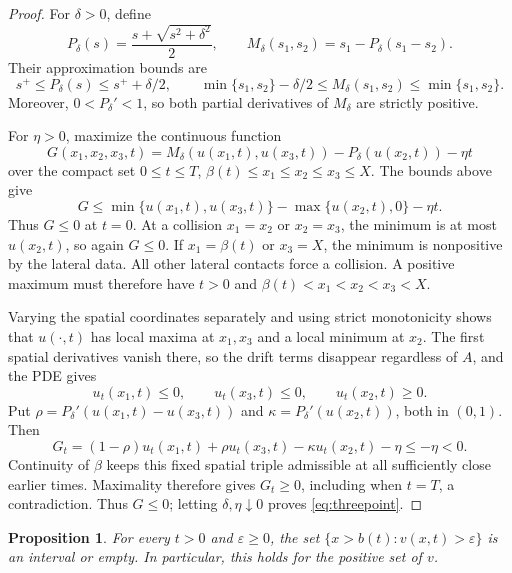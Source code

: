 \documentclass[11pt]{article}
\newtheorem{proposition}[theorem]{Proposition}
\begin{document}
\begin{proof}
For $\delta>0$, define
\[
  P_\delta(s)=\frac{s+\sqrt{s^2+\delta^2}}2,\qquad
  M_\delta(s_1,s_2)=s_1-P_\delta(s_1-s_2).
\]
Their approximation bounds are
\[
  s^+\le P_\delta(s)\le s^++\delta/2,
  \qquad
  \min\{s_1,s_2\}-\delta/2\le M_\delta(s_1,s_2)\le\min\{s_1,s_2\}.
\]
Moreover, $0<P_\delta'<1$, so both partial derivatives of
$M_\delta$ are strictly positive.

For $\eta>0$, maximize the continuous function
\[
  G(x_1,x_2,x_3,t)
    =M_\delta(u(x_1,t),u(x_3,t))-P_\delta(u(x_2,t))-\eta t
\]
over the compact set $0\le t\le T$,
$\beta(t)\le x_1\le x_2\le x_3\le X$.
The bounds above give
\[
  G\le\min\{u(x_1,t),u(x_3,t)\}-\max\{u(x_2,t),0\}-\eta t.
\]
Thus $G\le0$ at $t=0$. At a collision $x_1=x_2$ or $x_2=x_3$,
the minimum is at most $u(x_2,t)$, so again $G\le0$.
If $x_1=\beta(t)$ or $x_3=X$, the minimum is nonpositive by the
lateral data. All other lateral contacts force a collision.
A positive maximum must therefore have
$t>0$ and $\beta(t)<x_1<x_2<x_3<X$.

Varying the spatial coordinates separately and using strict
monotonicity shows that $u(\cdot,t)$ has local maxima at $x_1,x_3$
and a local minimum at $x_2$. The first spatial derivatives vanish
there, so the drift terms disappear regardless of $A$, and the PDE gives
\[
  u_t(x_1,t)\le0,\qquad u_t(x_3,t)\le0,\qquad u_t(x_2,t)\ge0.
\]
Put $\rho=P_\delta'(u(x_1,t)-u(x_3,t))$ and
$\kappa=P_\delta'(u(x_2,t))$, both in $(0,1)$. Then
\[
  G_t=(1-\rho)u_t(x_1,t)+\rho u_t(x_3,t)-\kappa u_t(x_2,t)-\eta
      \le-\eta<0.
\]
Continuity of $\beta$ keeps this fixed spatial triple admissible at
all sufficiently close earlier times. Maximality therefore gives
$G_t\ge0$, including when $t=T$, a contradiction.
Thus $G\le0$; letting $\delta,\eta\downarrow0$ proves \eqref{eq:threepoint}.
\end{proof}

\begin{proposition}\label{prop:interval}
For every $t>0$ and $\varepsilon\ge0$, the set
$\{x>b(t):v(x,t)>\varepsilon\}$ is an interval or empty.
In particular, this holds for the positive set of $v$.
\end{proposition}
\end{document}
